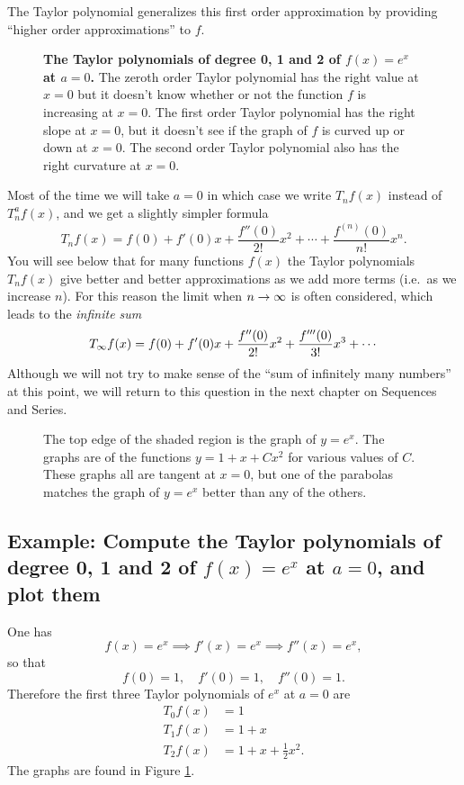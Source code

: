 The Taylor polynomial generalizes this first order approximation by
providing ``higher order approximations'' to $f$.
\begin{figure}[t]
  \centering 
  
  
  \caption{\textbf{The Taylor polynomials of degree 0, 1 and 2 of $f(x) =
  e^x$ at $a=0$.}  The zeroth order Taylor polynomial has the right
  value at $x=0$ but it doesn't know whether or not the function $f$ is
  increasing at $x=0$.  The first order Taylor polynomial has the right
  slope at $x=0$, but it doesn't see if the graph of $f$ is curved up or
  down at $x=0$.  The second order Taylor polynomial also has the right
  curvature at $x=0$.}
  \label{fig:02Taylor012}
\end{figure}

Most of the time we will take $a=0$ in which case we write $T_nf(x)$
instead of $T_n^af(x)$, and we get a slightly simpler formula
\begin{equation}
  \label{eq:taylor-at-zero}
  T_nf (x) = f (0) + f' (0) x
  +\frac{f'' (0)}{2!} x^2 +\cdots
  +\frac{f^{(n)}{(0)}}{n!} x^n.
\end{equation}
You will see below that for many functions $f(x)$ the Taylor polynomials
$T_nf(x)$ give better and better approximations as we add more terms
(i.e.~as we increase $n$). For this reason the limit when $n\to\infty$ is often
considered, which leads to the \textit{infinite sum}
\[
T_{\infty} f(x) = f (0) + f' (0) x +\frac{f'' (0)}{2!} x^2+\frac{f'''(0)}{3!} x^3
+\cdots
\]
Although we will not try to make sense of the ``sum of infinitely many
numbers'' at this point, we will return to this question in the next chapter on
Sequences and Series.



\begin{figure}[b]
  \centering 
  \caption{The top edge of the shaded region is the graph of $y=e^x$.  The
  graphs are of the functions $y= 1+x+Cx^2$ for various values of $C$.
  These graphs all are tangent at $x=0$, but one of the parabolas matches
  the graph of $y=e^x$ better than any of the others. }
  \label{fig:exp-taylor}
\end{figure}

\subsection{Example: Compute the Taylor polynomials of degree 0, 1 and 2 of %
$f (x)=e^x$ at $a=0$, and plot them} One has
\[
f(x) = e^x \implies f' (x)= e^x \implies f'' (x) = e^x,
\]
so that
\[
f(0) = 1 , \quad f'(0)=1, \quad f''(0)=1.
\]
Therefore the first three Taylor polynomials of $e^x$ at $a=0$ are
\begin{align*}
  T_0 f (x) & = 1 \\
  T_1 f (x) & = 1+x \\
  T_2 f (x) & = 1+x+\frac12 x^2.
\end{align*}
The graphs are found in Figure \ref{fig:02Taylor012}.  

